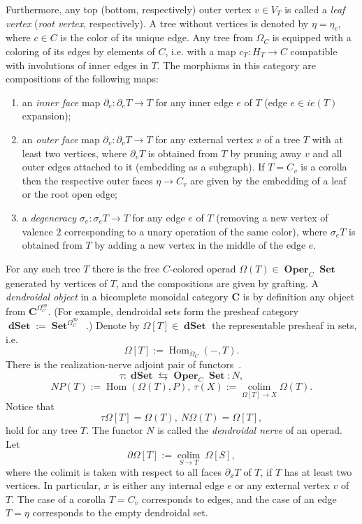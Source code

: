 \documentclass{amsart}
\theoremstyle{definition}
\theoremstyle{remark}
\newcommand{\Cc}{\mathbf{C}}
\DeclareMathOperator{\col}{colim}
\DeclareMathOperator{\Hm}{Hom}
\DeclareMathOperator{\Set}{\mathbf{Set}}
\DeclareMathOperator{\Oper}{\mathbf{Oper}}
\DeclareMathOperator{\dset}{\mathbf{dSet}}
\newcommand{\rcolon}{\mathrel{}\colon\!}
\begin{document}
	Furthermore, any top (bottom, respectively) outer vertex $v\in V_{T}$ is called a \textit{leaf vertex} (\textit{root vertex}, respectively).
	A tree without vertices is denoted by $\eta=\eta_{c}$, where $c\in C$ is the color of its unique edge.
	Any tree from $\Omega_{C}$ is equipped with a coloring of its edges by elements of $C$, i.e. with a map $c_{T}\colon H_T\to C$ compatible with involutions of inner edges in $T$.
	The morphisms in this category are compositions of the following maps:
	\begin{enumerate}[label=(\roman*)]
		\item an \emph{inner face} map $\partial_{e}\colon \partial_{e}T\to T$ for any inner edge $e$ of $T$ (edge $e\in ie(T)$ expansion);
		\item an \emph{outer face} map $\partial_{v}\colon \partial_{v}T\to T$ for any external vertex $v$ of a tree $T$ with at least two vertices, where $\partial_{v}T$ is obtained from $T$ by pruning away $v$ and all outer edges attached to it (embedding as a subgraph).
		If $T=C_{v}$ is a corolla then the respective outer faces $\eta\to C_{v}$ are given by the embedding of a leaf or the root open edge;
		\item a \emph{degeneracy} $\sigma_{e}\colon \sigma_{e}T \to T$ for any edge $e$ of $T$ (removing a new vertex of valence $2$ corresponding to a unary operation of the same color), where $\sigma_{e}T$ is obtained from $T$ by adding a new vertex in the middle of the edge $e$.
	\end{enumerate}
	
	For any such tree $T$ there is the free $C$-colored operad $\Omega(T)\in \Oper_{C}\Set$ generated by vertices of $T$, and the compositions are given by grafting.
	A \emph{dendroidal object} in a bicomplete monoidal category $\Cc$ is by definition any object from $\Cc^{\Omega^{op}_{C}}$.
	(For example, dendroidal sets form the presheaf category $\dset:=\Set^{\Omega_{C}^{op}}$~\cite{we-07,he-mo-22}.)
	Denote by $\Omega[T]\in \dset$ the representable presheaf in sets, i.e.
	\[
	\Omega[T]:=\Hm_{\Omega_{C}}(-,T).
	\]
	There is the realization-nerve adjoint pair of functors~\cite[\S 3.5.1]{he-mo-22}.
	\begin{equation}\label{eq:nrpair}
		\tau\colon \dset\leftrightarrows \Oper_{C}\Set\rcolon N,
	\end{equation}
	\[
	NP(T):=\Hm(\Omega(T),P),\ \tau(X):=\underset{\Omega[T]\to X}{\col} \Omega(T).
	\]
	Notice that 
	\[
	\tau \Omega[T]=\Omega(T),\ 
	N \Omega(T)=\Omega[T],
	\]
	hold for any tree $T$.
	The functor $N$ is called the \textit{dendroidal nerve} of an operad.
	Let
	\[
	\partial \Omega[T]:=\underset{S\to T}{\col}\ \Omega[S],
	\]
	where the colimit is taken with respect to all faces $\partial_{x} T$ of $T$, if $T$ has at least two vertices.
	In particular, $x$ is either any internal edge $e$ or any external vertex $v$ of $T$. The case of a corolla $T=C_{v}$ corresponds to edges, and the case of an edge $T=\eta$ corresponds to the empty dendroidal set. 
	
\end{document}
